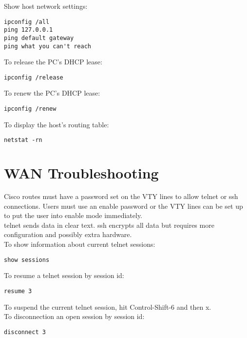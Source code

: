 \documentclass{article}
\begin{document}
Show host network settings:

\begin{verbatim}
ipconfig /all
ping 127.0.0.1
ping default gateway
ping what you can't reach
\end{verbatim}

To release the PC's DHCP lease:

\begin{verbatim}
ipconfig /release
\end{verbatim}

To renew the PC's DHCP lease:

\begin{verbatim}
ipconfig /renew
\end{verbatim}

To display the host's routing table:

\begin{verbatim}
netstat -rn
\end{verbatim}

\section{WAN Troubleshooting}

Cisco routes must have a password set on the VTY lines to allow telnet or
ssh connections. Users must use an enable password or the VTY lines can be
set up to put the user into enable mode immediately.\\

telnet sends data in clear text. ssh encrypts all data but requires more
configuration and possibly extra hardware.\\

To show information about current telnet sessions:

\begin{verbatim}
show sessions
\end{verbatim}

To resume a telnet session by session id:

\begin{verbatim}
resume 3
\end{verbatim}

To suspend the current telnet session, hit Control-Shift-6 and then x.\\

To disconnection an open session by session id:

\begin{verbatim}
disconnect 3
\end{verbatim}
\end{document}
